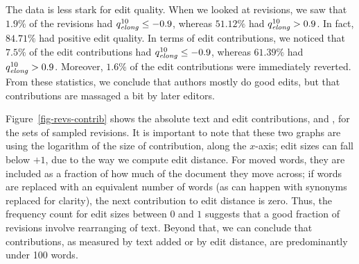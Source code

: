 The data is less stark for edit quality.
When we looked at revisions, we saw that $1.9\%$ of the revisions
had $\quality{elong}{10}{} \le -0.9$, whereas $51.12\%$ had
$\quality{elong}{10}{} > 0.9$.
In fact, $84.71\%$ had positive edit quality.
In terms of edit contributions, we noticed that $7.5\%$ of the
edit contributions had $\quality{elong}{10}{} \le -0.9$, whereas
$61.39\%$ had $\quality{elong}{10}{} > 0.9$.
Moreover, $1.6\%$ of the edit contributions were immediately
reverted.
From these statistics, we conclude that authors mostly do good
edits, but that contributions are massaged a bit by later editors.

Figure~\ref{fig-revs-contrib} shows the absolute text and edit
contributions,  and , for the sets of sampled revisions.
It is important to note that these two graphs are using
the logarithm of the size of contribution, along the $x$-axis;
edit sizes can fall below $+1$, due to the way we compute
edit distance.
For moved words, they are included as a fraction of how much of
the document they move across;
if words are replaced with an equivalent number of words (as
can happen with synonyms replaced for clarity), the next contribution
to edit distance is zero.
Thus, the frequency count for edit sizes between $0$ and $1$
suggests that a good fraction of revisions involve rearranging
of text.
Beyond that, we can conclude that contributions, as measured
by text added or by edit distance, are predominantly under
100 words.
%
